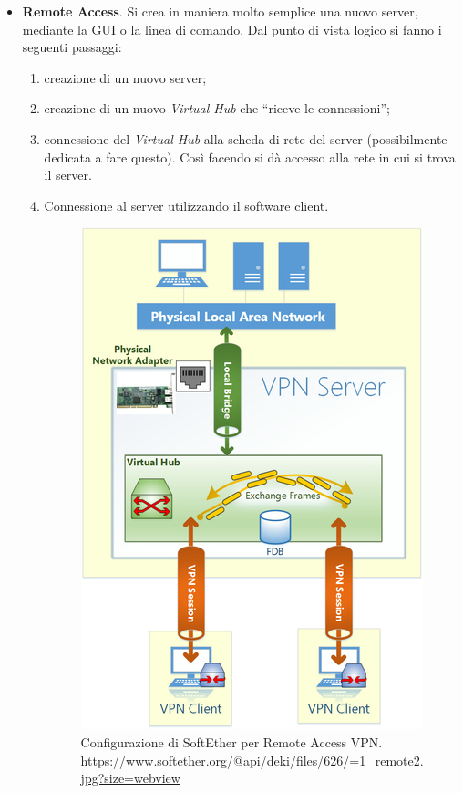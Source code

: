 \begin{itemize}
  \item \textbf{Remote Access}. Si crea in maniera molto semplice una nuovo server, mediante la GUI o
  la linea di comando. Dal punto di vista logico si fanno i seguenti passaggi:
  \begin{enumerate}
    \item creazione di un nuovo server;
    \item creazione di un nuovo \textit{Virtual Hub} che ``riceve le connessioni'';
    \item connessione del \textit{Virtual Hub} alla scheda di rete del server (possibilmente dedicata a fare
    questo). Così facendo si dà accesso alla rete in cui si trova il server.
    \item Connessione al server utilizzando il software client.
    \begin{figure}
      \includegraphics[scale=0.4]{img/softether_ras}
      \caption[Configurazione di SoftEther per Remote Access VPN]{
        Configurazione di SoftEther per Remote Access VPN.
        \url{https://www.softether.org/@api/deki/files/626/=1_remote2.jpg?size=webview}}
        \label{fig:softether_ras}
    \end{figure}

\end{enumerate}
\end{itemize}
